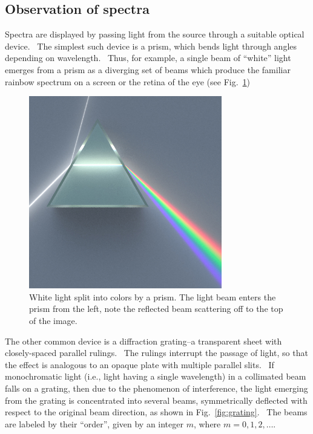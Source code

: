 \documentclass{article}
\begin{document}
\subsection{Observation of spectra}


Spectra are displayed by passing light from the source through a 
suitable optical device. \ The simplest such device is a prism, which
bends light through angles depending on wavelength. \ Thus, for
example, a single beam of ``white'' light
emerges from a prism as a diverging set of beams which produce the
familiar rainbow spectrum on a screen or the retina of the eye (see
Fig.~\ref{fig:prism})

\begin{figure}
\begin{centering}
 \includegraphics[width=0.75\textwidth]{images/Dispersive_Prism.jpg} 
\caption{White light split into colors by a prism.  The light beam enters the prism from the left, note the reflected beam scattering off to the top of the image.}
\label{fig:prism}
\end{centering}
\end{figure}

The other common device is a diffraction grating--a transparent sheet
with closely-spaced parallel rulings. \ The rulings interrupt the
passage of light, so that the effect is analogous to an opaque plate
with multiple parallel slits. \ If monochromatic light (i.e., light
having a single wavelength) in a collimated beam falls on a grating,
then due to the phenomenon of interference, the light emerging from the
grating is concentrated into several beams, symmetrically deflected
with respect to the original beam direction, as shown in Fig.~\ref{fig:grating}. \ The
beams are labeled by their ``order'', given
by an integer $m$, where $m = 0,1,2,\ldots$.
\end{document}
